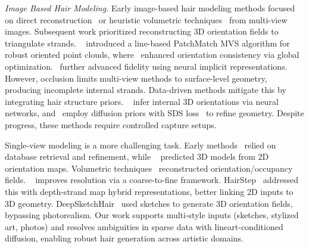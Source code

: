 \vspace{4pt}
\noindent \textit{Image Based Hair Modeling.}
Early image-based hair modeling methods focused on direct reconstruction~\cite{kong1998generation} or heuristic volumetric techniques~\cite{paris2004capture} from multi-view images. Subsequent work prioritized reconstructing 3D orientation fields to triangulate strands. ~\cite{nam2019strand} introduced a line-based PatchMatch MVS algorithm for robust oriented point clouds, where~\cite{takimoto2024dr} enhanced orientation consistency via global optimization.~\cite{zhou2024groomcap} further advanced fidelity using neural implicit representations. However, occlusion limits multi-view methods to surface-level geometry, producing incomplete internal strands.
%
Data-driven methods mitigate this by integrating hair structure priors. ~\cite{kuang2022deepmvshair,wu2024monohair} infer internal 3D orientations via neural networks, and~\cite{zakharov2025human,sklyarova2023neural} employ diffusion priors with SDS loss~\cite{poole2022dreamfusion} to refine geometry. Despite progress, these methods require controlled capture setups.

Single-view modeling is a more challenging task. Early methods~\cite{chai2016autohair,chai2015high,hu2015single,chai2012single,chai2013dynamic} relied on database retrieval and refinement, while ~\cite{zhou2018hairnet} predicted 3D models from 2D orientation maps. Volumetric techniques~\cite{saito20183d,zhang2019hair} reconstructed orientation/occupancy fields.
%
~\cite{wu2022neuralhdhair} improves resolution via a coarse-to-fine framework. HairStep~\cite{zheng2023hairstep} addressed this with depth-strand map hybrid representations, better linking 2D inputs to 3D geometry. 
%
DeepSketchHair~\cite{shen2020deepsketchhair} used sketches to generate 3D orientation fields, bypassing photorealism.
%
Our work supports multi-style inputs (sketches, stylized art, photos) and resolves ambiguities in sparse data with lineart-conditioned diffusion, enabling robust hair generation across artistic domains.


